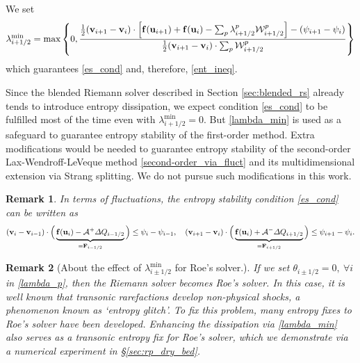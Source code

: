 \documentclass[preprint, 11pt]{article}
\newcommand{\W}{{\mathcal W}}
\newcommand{\A}{{\mathcal A}}
\newcommand{\bff}{{\bf f}}
\newcommand{\bfF}{{\bf F}}
\newcommand{\bfu}{{\bf u}}
\newcommand{\bfv}{{\bf v}}
\newtheorem{remark}{Remark}
\begin{document}
We set
\begin{align}\label{lambda_min}
  \lambda_{i+1/2}^{\min} = \max\left\{0,\frac{\frac{1}{2}(\bfv_{i+1}-\bfv_{i})\cdot\left[\bff(\bfu_{i+1})+\bff(\bfu_{i})-\sum_p\lambda_{i+1/2}^p\W_{i+1/2}^p\right]-(\psi_{i+1}-\psi_i)}{\frac{1}{2}(\bfv_{i+1}-\bfv_{i})\cdot\sum_p\W_{i+1/2}^p}\right\}
\end{align}
which guarantees \eqref{es_cond} and, therefore, \eqref{ent_ineq}.

Since the blended Riemann solver described in Section \ref{sec:blended_rs} already
tends to introduce entropy dissipation,
we expect condition \eqref{es_cond} to be fulfilled most of the time even with $\lambda_{i+1/2}^{\min}=0$.
But \eqref{lambda_min} is used as a safeguard to guarantee entropy stability of the first-order method.
Extra modifications would be needed to guarantee entropy stability of the second-order Lax-Wendroff-LeVeque method
\eqref{second-order_via_fluct} and its multidimensional extension via Strang splitting.
We do not pursue such modifications in this work.

\begin{remark}
In terms of fluctuations, the entropy stability condition \eqref{es_cond} can be written as
\begin{align*}
  (\bfv_{i}-\bfv_{i-1})\cdot
  \Big(
  \underbrace{\bff(\bfu_i)-\A^+\Delta Q_{i-1/2}}_{=\bfF_{i-1/2}}\Big)\leq \psi_{i}-\psi_{i-1},
  \quad
  (\bfv_{i+1}-\bfv_i)\cdot
  \Big(\underbrace{\bff(\bfu_i)+\A^-\Delta Q_{i+1/2}}_{=\bfF_{i+1/2}}\Big)\leq \psi_{i+1}-\psi_i.
\end{align*}
\end{remark}

\begin{remark}[About the effect of $\lambda_{i\pm 1/2}^{\min}$ for Roe's solver.]
  If we set $\theta_{i\pm 1/2}=0, ~\forall i$ in \eqref{lambda_p}, then the Riemann solver becomes Roe's solver.
  In this case, it is well known that transonic rarefactions develop non-physical shocks,
  a phenomenon known as `entropy glitch'. To fix this problem, many entropy fixes to Roe's
  solver have been developed. Enhancing the dissipation via \eqref{lambda_min}
  also serves as a transonic entropy fix for Roe's solver, which we demonstrate
  via a numerical experiment in \S \ref{sec:rp_dry_bed}.
\end{remark}

\clearpage
\end{document}
